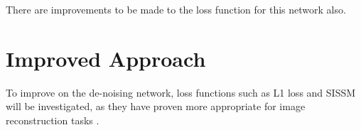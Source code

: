 \documentclass[10pt,twocolumn,letterpaper]{article}
\begin{document}

There are improvements to be made to the loss function for this network also. 


\section{Improved Approach}

To improve on the de-noising network, loss functions such as L1 loss and SISSM will be investigated, as they have proven more appropriate for image reconstruction tasks \cite{something}. 

{\small


}
\end{document}
